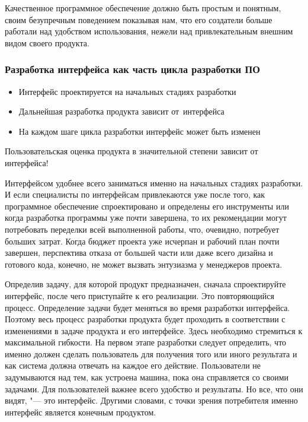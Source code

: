 \documentclass{../industrial-development}
\begin{document}
Качественное программное обеспечение должно быть простым и понятным, своим безупречным поведением показывая нам, что его создатели больше работали над удобством использования, нежели над привлекательным внешним видом своего продукта.~\cite[с.~5--6]{Raskin}

\begin{frame} \frametitle{Разработка интерфейса как часть цикла разработки ПО}
  \begin{itemize}
  \item Интерфейс проектируется на начальных стадиях разработки
  \item Дальнейшая разработка продукта зависит от~интерфейса
  \item На каждом шаге цикла разработки интерфейс может быть изменен
  \end{itemize}
  
  \begin{block}{}
    Пользовательская оценка продукта в значительной степени зависит от интерфейса!
  \end{block}
\end{frame}

\lecturenotes

Интерфейсом удобнее всего заниматься именно на начальных стадиях разработки. И если специалисты по интерфейсам привлекаются уже после того, как программное обеспечение спроектировано и определены его инструменты или когда разработка программы уже почти завершена, то их рекомендации могут потребовать переделки всей выполненной работы, что, очевидно, потребует больших затрат. Когда бюджет проекта уже исчерпан и рабочий план почти завершен, перспектива отказа от большей части или даже всего дизайна и готового кода, конечно, не может вызвать энтузиазма у менеджеров проекта. 

Определив задачу, для которой продукт предназначен, сначала спроектируйте интерфейс, после чего приступайте к его реализации. Это повторяющийся процесс. Определение задачи будет меняться во время разработки интерфейса. Поэтому весь процесс разработки продукта будет проходить в соответствии с изменениями в задаче продукта и его интерфейсе. Здесь необходимо стремиться к максимальной гибкости. На первом этапе разработки следует определить, что именно должен сделать пользователь для получения того или иного результата и как система должна отвечать на каждое его действие. Пользователи не задумываются над тем, как устроена машина, пока она справляется со своими задачами. Для пользователей важнее всего удобство и результаты. Но все, что они видят, "--- это интерфейс. Другими словами, с точки зрения потребителя именно интерфейс является конечным продуктом.~\cite[с.~7--8]{Raskin}
\end{document}
